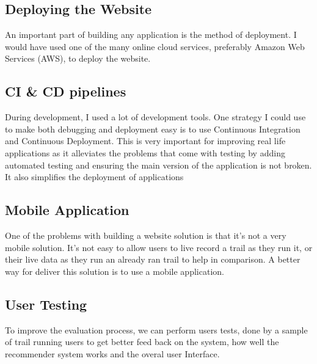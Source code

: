 \subsection{Deploying the Website}
An important part of building any application is the method of deployment. I would have used one of the many online cloud services, preferably Amazon Web Services (AWS), to deploy the website.

\subsection{CI \& CD pipelines}
During development, I used a lot of development tools. One strategy I could use to make both debugging and deployment easy is to use Continuous Integration and Continuous Deployment. This is very important for improving real life applications as it alleviates the problems that come with testing by adding automated testing and ensuring the main version of the application is not broken. It also simplifies the deployment of applications

\subsection{Mobile Application}
One of the problems with building a website solution is that it's not a very mobile solution. It's not easy to allow users to live record a trail as they run it, or their live data as they run an already ran trail to help in comparison. A better way for deliver this solution is to use a mobile application.

\subsection{User Testing}
To improve the evaluation process, we can perform users tests, done by a sample of trail running users to get better feed back on the system, how well the recommender system works and the overal user Interface.